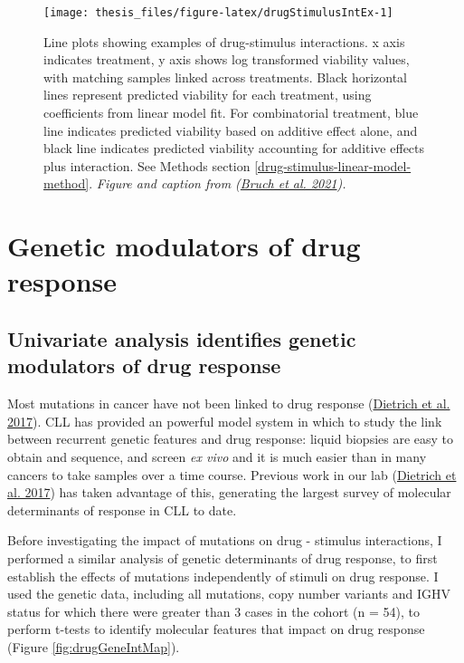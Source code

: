 \documentclass[11pt, a4paper, twosided]{book}
\begin{document}
\begin{figure}[H]

{\centering \texttt{[image: thesis\_files/figure-latex/drugStimulusIntEx-1]} 

}

\caption{Line plots showing examples of drug-stimulus interactions. x axis indicates treatment, y axis shows log transformed viability values, with matching samples linked across treatments. Black horizontal lines represent predicted viability for each treatment, using coefficients from linear model fit. For combinatorial treatment, blue line indicates predicted viability based on additive effect alone, and black line indicates predicted viability accounting for additive effects plus interaction. See Methods section \ref{drug-stimulus-linear-model-method}. \emph{Figure and caption from (\protect\hyperlink{ref-Giles2021}{Bruch et al. 2021}).}}\label{fig:drugStimulusIntEx}
\end{figure}
\hypertarget{mapping-genetic-modulators}{%
\section{Genetic modulators of drug response}\label{mapping-genetic-modulators}}

\hypertarget{univariate-gene-drug-associations}{%
\subsection{Univariate analysis identifies genetic modulators of drug response}\label{univariate-gene-drug-associations}}

Most mutations in cancer have not been linked to drug response (\protect\hyperlink{ref-JCIpaper}{Dietrich et al. 2017}). CLL has provided an powerful model system in which to study the link between recurrent genetic features and drug response: liquid biopsies are easy to obtain and sequence, and screen \emph{ex vivo} and it is much easier than in many cancers to take samples over a time course. Previous work in our lab (\protect\hyperlink{ref-JCIpaper}{Dietrich et al. 2017}) has taken advantage of this, generating the largest survey of molecular determinants of response in CLL to date.

Before investigating the impact of mutations on drug - stimulus interactions, I performed a similar analysis of genetic determinants of drug response, to first establish the effects of mutations independently of stimuli on drug response. I used the genetic data, including all mutations, copy number variants and IGHV status for which there were greater than 3 cases in the cohort (n = 54), to perform t-tests to identify molecular features that impact on drug response (Figure \ref{fig:drugGeneIntMap}).
\end{document}
